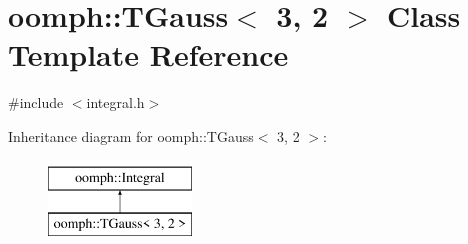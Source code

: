 \hypertarget{classoomph_1_1TGauss_3_013_00_012_01_4}{}\section{oomph\+:\+:T\+Gauss$<$ 3, 2 $>$ Class Template Reference}
\label{classoomph_1_1TGauss_3_013_00_012_01_4}


{\ttfamily \#include $<$integral.\+h$>$}

Inheritance diagram for oomph\+:\+:T\+Gauss$<$ 3, 2 $>$\+:\begin{figure}[H]
\begin{center}
\leavevmode
\includegraphics[height=2.000000cm]{classoomph_1_1TGauss_3_013_00_012_01_4}
\end{center}
\end{figure}
